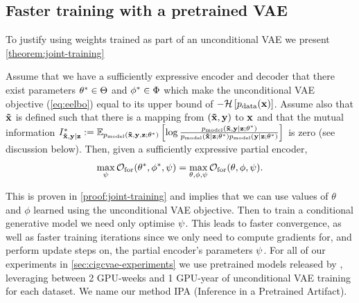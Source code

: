 \subsection{Faster training with a pretrained VAE}
To justify using weights trained as part of an unconditional VAE we present
\cref{theorem:joint-training}
%
\begin{theorem} \label{theorem:joint-training} Assume that we have a
  sufficiently expressive encoder and decoder that there exist parameters
  ${\theta}^*\in\Theta$ and ${\phi}^*\in\Phi$ which make the
  unconditional VAE objective (\cref{eq:eelbo}) equal to its upper bound of
  $-\mathcal{H}\left[ p_{\rm{data}}(\mathbf{x}) \right]$. Assume also that $\mathbf{\tilde{x}}{}$ is
  defined such that there is a mapping from $(\mathbf{\tilde{x}}{},\mathbf{y}{})$ to $\mathbf{x}{}$ and
  that the mutual information ${I^*_{\mathbf{\tilde{x}}{},\mathbf{y}{}|\mathbf{z}{}}{} := \mathbb{E}_{p_{\rm{model}}{}(\mathbf{\tilde{x}}{}, \mathbf{y}{},
      \mathbf{z}{}; \theta^*)} \left[ \log \frac{p_{\rm{model}}{}(\mathbf{\tilde{x}}{},\mathbf{y}{}|\mathbf{z}{}; \theta^*)
      }{ p_{\rm{model}}{}(\mathbf{\tilde{x}}{}|\mathbf{z}{}; \theta^*)p_{\rm{model}}{}(\mathbf{y}{}|\mathbf{z}{}; \theta^*) }
    \right]}$ is zero (see discussion below). Then, given a sufficiently expressive
  partial encoder,
  \begin{equation} \label{eq:joint-training}
    \max_{\psi{}} \mathcal{O}_\mathrm{for}({\theta}^*, {\phi}^*, \psi{}) = \max_{\theta, \phi, \psi{}} \mathcal{O}_\mathrm{for}(\theta, \phi, \psi{}).
  \end{equation}
\end{theorem}
%
%
This is proven in \cref{proof:joint-training} and implies that we can use values
of $\theta$ and $\phi$ learned using the unconditional VAE objective. Then to
train a conditional generative model we need only optimise $\psi{}$. This
leads to faster convergence, as well as faster training iterations since we only
need to compute gradients for, and perform update steps on, the partial
encoder's parameters $\psi{}$. For all of our experiments in
\cref{sec:cigcvae-experiments} we use pretrained models released by
\citet{child2020very}, leveraging between 2 GPU-weeks and 1 GPU-year of
unconditional VAE training for each dataset. We name our method IPA (Inference
in a Pretrained Artifact).

